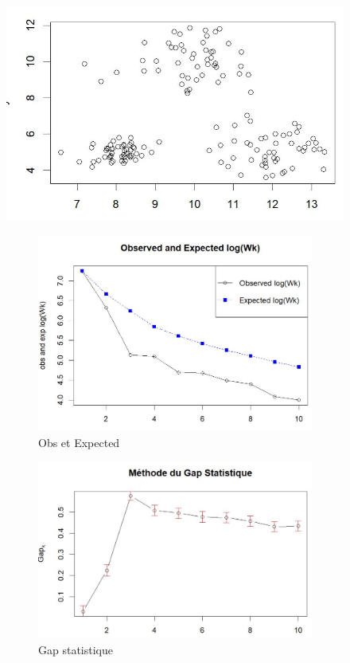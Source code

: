 \begin{figure}[H]
    \centering
    \includegraphics[width=0.7\linewidth]{images/obs2.JPG}
    \caption{}
    \label{fig:large-image}
    
    \begin{subfigure}[b]{0.45\linewidth} %
        \centering
        \includegraphics[width=\linewidth]{images/Exp2.JPG}
        \caption{Obs et Expected}
        \label{fig:Obs et Expected}
    \end{subfigure}
    \hspace{0.05\linewidth} %
    \begin{subfigure}[b]{0.47\linewidth} %
        \centering
        \includegraphics[width=\linewidth]{images/Gaps2.JPG}
        \caption{Gap statistique}
        \label{fig:right-small}
    \end{subfigure}
    \caption{}
    \label{fig:combined-figure}
\end{figure}

